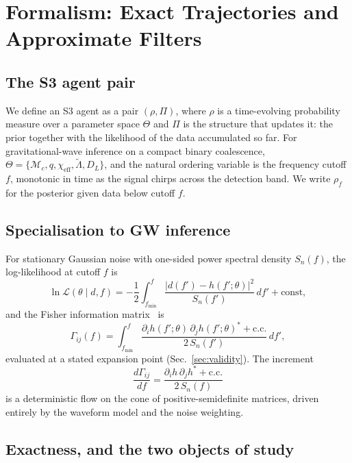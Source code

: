\documentclass[twocolumn,prd,showpacs,superscriptaddress]{revtex4-2}
\newcommand{\Mchirp}{\mathcal{M}_c}
\newcommand{\Lambdatilde}{\tilde{\Lambda}}
\newcommand{\chieff}{\chi_{\text{eff}}}
\newcommand{\Dl}{D_L}
\newcommand{\fmin}{f_{\text{min}}}
\newcommand{\secref}[1]{Sec.~\ref{sec:#1}}
\begin{document}
\section{Formalism: Exact Trajectories and Approximate Filters}
\label{sec:formalism}

\subsection{The S3 agent pair}

We define an S3 agent as a pair $(\rho, \Pi)$, where $\rho$ is a time-evolving probability measure over a parameter space $\Theta$ and $\Pi$ is the structure that updates it: the prior together with the likelihood of the data accumulated so far. For gravitational-wave inference on a compact binary coalescence, $\Theta = \{\Mchirp, q, \chieff, \Lambdatilde, \Dl\}$, and the natural ordering variable is the frequency cutoff $f$, monotonic in time as the signal chirps across the detection band. We write $\rho_f$ for the posterior given data below cutoff $f$.

\subsection{Specialisation to GW inference}

For stationary Gaussian noise with one-sided power spectral density $S_n(f)$, the log-likelihood at cutoff $f$ is
\begin{equation}
\ln \mathcal{L}(\theta \mid d, f) = -\frac12 \int_{\fmin}^{f}
\frac{|d(f') - h(f'; \theta)|^2}{S_n(f')}\,df' + \text{const},
\label{eq:likelihood}
\end{equation}
and the Fisher information matrix~\cite{cutler1994fisher,vallisneri2008fisher} is
\begin{equation}
\Gamma_{ij}(f) = \int_{\fmin}^{f}
\frac{\partial_i h(f';\theta)\,\partial_j h(f';\theta)^{*} + \text{c.c.}}
{2\,S_n(f')}\,df',
\label{eq:fisher}
\end{equation}
evaluated at a stated expansion point (\secref{validity}). The increment
\begin{equation}
\frac{d\Gamma_{ij}}{df} =
\frac{\partial_i h\,\partial_j h^{*} + \text{c.c.}}{2\,S_n(f)}
\label{eq:fisher_flow}
\end{equation}
is a deterministic flow on the cone of positive-semidefinite matrices, driven entirely by the waveform model and the noise weighting.

\subsection{Exactness, and the two objects of study}
\label{sec:exactness}
\end{document}
